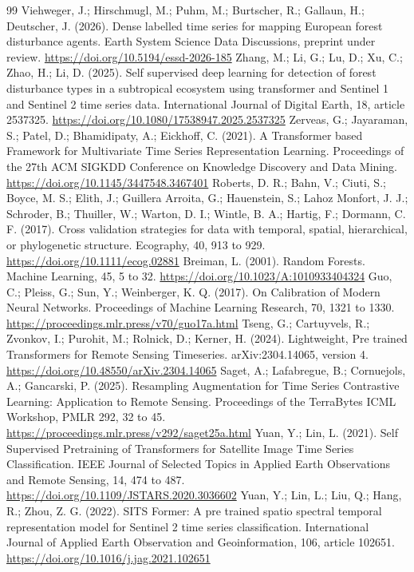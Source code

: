\documentclass[11pt,a4paper]{article}
\begin{document}
\begin{thebibliography}{99}
\small
{} Viehweger, J.; Hirschmugl, M.; Puhm, M.; Burtscher, R.; Gallaun, H.; Deutscher, J. (2026). Dense labelled time series for mapping European forest disturbance agents. Earth System Science Data Discussions, preprint under review. \url{https://doi.org/10.5194/essd-2026-185}
 Zhang, M.; Li, G.; Lu, D.; Xu, C.; Zhao, H.; Li, D. (2025). Self supervised deep learning for detection of forest disturbance types in a subtropical ecosystem using transformer and Sentinel 1 and Sentinel 2 time series data. International Journal of Digital Earth, 18, article 2537325. \url{https://doi.org/10.1080/17538947.2025.2537325}
 Zerveas, G.; Jayaraman, S.; Patel, D.; Bhamidipaty, A.; Eickhoff, C. (2021). A Transformer based Framework for Multivariate Time Series Representation Learning. Proceedings of the 27th ACM SIGKDD Conference on Knowledge Discovery and Data Mining. \url{https://doi.org/10.1145/3447548.3467401}
 Roberts, D. R.; Bahn, V.; Ciuti, S.; Boyce, M. S.; Elith, J.; Guillera Arroita, G.; Hauenstein, S.; Lahoz Monfort, J. J.; Schroder, B.; Thuiller, W.; Warton, D. I.; Wintle, B. A.; Hartig, F.; Dormann, C. F. (2017). Cross validation strategies for data with temporal, spatial, hierarchical, or phylogenetic structure. Ecography, 40, 913 to 929. \url{https://doi.org/10.1111/ecog.02881}
 Breiman, L. (2001). Random Forests. Machine Learning, 45, 5 to 32. \url{https://doi.org/10.1023/A:1010933404324}
 Guo, C.; Pleiss, G.; Sun, Y.; Weinberger, K. Q. (2017). On Calibration of Modern Neural Networks. Proceedings of Machine Learning Research, 70, 1321 to 1330. \url{https://proceedings.mlr.press/v70/guo17a.html}
 Tseng, G.; Cartuyvels, R.; Zvonkov, I.; Purohit, M.; Rolnick, D.; Kerner, H. (2024). Lightweight, Pre trained Transformers for Remote Sensing Timeseries. arXiv:2304.14065, version 4. \url{https://doi.org/10.48550/arXiv.2304.14065}
 Saget, A.; Lafabregue, B.; Cornuejols, A.; Gancarski, P. (2025). Resampling Augmentation for Time Series Contrastive Learning: Application to Remote Sensing. Proceedings of the TerraBytes ICML Workshop, PMLR 292, 32 to 45. \url{https://proceedings.mlr.press/v292/saget25a.html}
 Yuan, Y.; Lin, L. (2021). Self Supervised Pretraining of Transformers for Satellite Image Time Series Classification. IEEE Journal of Selected Topics in Applied Earth Observations and Remote Sensing, 14, 474 to 487. \url{https://doi.org/10.1109/JSTARS.2020.3036602}
 Yuan, Y.; Lin, L.; Liu, Q.; Hang, R.; Zhou, Z. G. (2022). SITS Former: A pre trained spatio spectral temporal representation model for Sentinel 2 time series classification. International Journal of Applied Earth Observation and Geoinformation, 106, article 102651. \url{https://doi.org/10.1016/j.jag.2021.102651}

\end{thebibliography}
\end{document}

